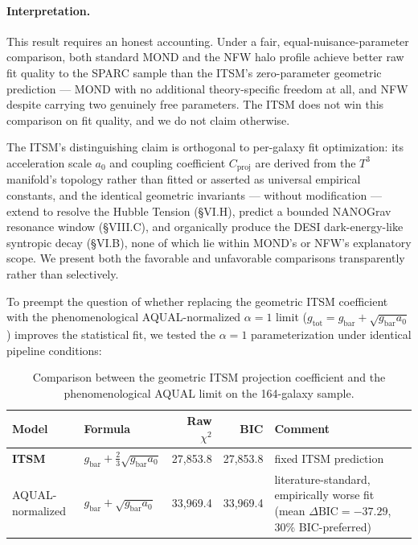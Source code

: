 \documentclass[aps,prd,10pt,twocolumn,superscriptaddress,nofootinbib,floatfix]{revtex4-2}
\begin{document}
\paragraph{Interpretation.} This result requires an honest accounting. Under a fair, equal-nuisance-parameter comparison, both standard MOND and the NFW halo profile achieve better raw fit quality to the SPARC sample than the ITSM's zero-parameter geometric prediction --- MOND with no additional theory-specific freedom at all, and NFW despite carrying two genuinely free parameters. The ITSM does not win this comparison on fit quality, and we do not claim otherwise.

The ITSM's distinguishing claim is orthogonal to per-galaxy fit optimization: its acceleration scale $a_0$ and coupling coefficient $C_{\text{proj}}$ are derived from the $T^3$ manifold's topology rather than fitted or asserted as universal empirical constants, and the identical geometric invariants --- without modification --- extend to resolve the Hubble Tension (\S VI.H), predict a bounded NANOGrav resonance window (\S VIII.C), and organically produce the DESI dark-energy-like syntropic decay (\S VI.B), none of which lie within MOND's or NFW's explanatory scope. We present both the favorable and unfavorable comparisons transparently rather than selectively.

To preempt the question of whether replacing the geometric ITSM coefficient with the phenomenological AQUAL-normalized $\alpha=1$ limit ($g_{\text{tot}} = g_{\text{bar}} + \sqrt{g_{\text{bar}}a_0}$) improves the statistical fit, we tested the $\alpha=1$ parameterization under identical pipeline conditions:

\begin{table}[htbp]
\centering
\caption{\footnotesize Comparison between the geometric ITSM projection coefficient and the phenomenological AQUAL limit on the 164-galaxy sample.}
\label{tab:aqual}
\begin{tabular}{llrrp{5cm}}
\toprule
\textbf{Model} & \textbf{Formula} & \textbf{Raw $\chi^2$} & \textbf{BIC} & \textbf{Comment} \\
\midrule
\textbf{ITSM} & $g_{\text{bar}}+\frac{2}{3}\sqrt{g_{\text{bar}}a_0}$ & 27,853.8 & 27,853.8 & fixed ITSM prediction \\
AQUAL-normalized & $g_{\text{bar}}+\sqrt{g_{\text{bar}}a_0}$ & 33,969.4 & 33,969.4 & literature-standard, empirically worse fit (mean $\Delta\text{BIC} = -37.29$, 30\% BIC-preferred) \\
\bottomrule
\end{tabular}
\end{table}
\end{document}
